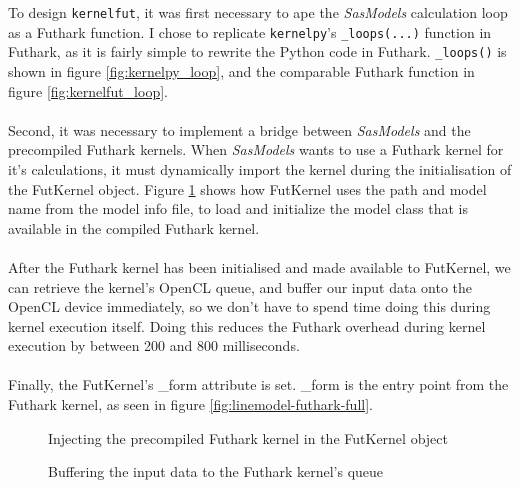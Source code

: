\documentclass[11pt]{article}
\newcommand{\sasmodels}{\textit{SasModels}}
\begin{document}
To design \texttt{kernelfut}, it was first necessary to ape the 
\sasmodels{} calculation loop as a Futhark function. 
I chose to replicate \texttt{kernelpy}'s \texttt{\_loops(...)} function in 
Futhark, as it is fairly simple to rewrite the Python code in Futhark.
\texttt{\_loops()} is shown in figure \ref{fig:kernelpy_loop}, and the
comparable Futhark function in figure \ref{fig:kernelfut_loop}.
\\\\
Second, it was necessary to implement a bridge between \sasmodels{} and the 
precompiled Futhark kernels. 
When \sasmodels{} wants to use a Futhark kernel for it's calculations, 
it must dynamically import the kernel during the initialisation of the FutKernel
object. Figure \ref{fig:retrieving-futhark-class} shows how FutKernel uses
the path and model name from the model info file, to load and initialize the
model class that is available in the compiled Futhark kernel.
\\\\
After the Futhark kernel has been initialised and made available to FutKernel,
we can retrieve the kernel's OpenCL queue, and buffer our input data onto the 
OpenCL device immediately, so we don't have to spend time doing this during 
kernel execution itself.
Doing this reduces the Futhark overhead during kernel execution by between
200 and 800 milliseconds.
\\\\
Finally, the FutKernel's _form attribute is set. _form is the entry point from
the Futhark kernel, as seen in figure \ref{fig:linemodel-futhark-full}.

\begin{figure}
  
  \label{fig:retrieving-futhark-class}
  \caption{Injecting the precompiled Futhark kernel in the FutKernel object}
\end{figure}


\begin{figure}
  
  \label{fig:buffering-kernelfut}
  \caption{Buffering the input data to the Futhark kernel's queue}
\end{figure}
\end{document}
